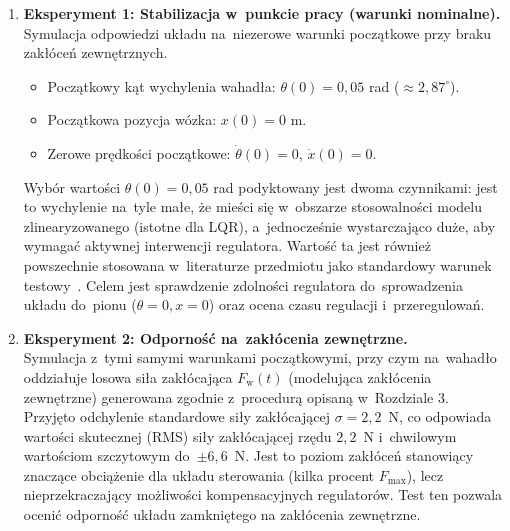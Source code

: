\begin{enumerate}
    \item \textbf{Eksperyment 1: Stabilizacja w~punkcie pracy (warunki nominalne).} \\
    Symulacja odpowiedzi układu na~niezerowe warunki początkowe przy braku
    zakłóceń zewnętrznych.
    \begin{itemize}
        \item Początkowy kąt wychylenia wahadła: $\theta(0) = 0{,}05$ rad ($\approx 2{,}87^\circ$).
        \item Początkowa pozycja wózka: $x(0) = 0$ m.
        \item Zerowe prędkości początkowe: $\dot{\theta}(0) = 0$, $\dot{x}(0) = 0$.
    \end{itemize}
    Wybór wartości $\theta(0) = 0{,}05$ rad podyktowany jest dwoma czynnikami:
    jest to wychylenie na~tyle małe, że mieści się w~obszarze stosowalności 
    modelu zlinearyzowanego (istotne dla LQR), a~jednocześnie wystarczająco duże,
    aby wymagać aktywnej interwencji regulatora. Wartość ta jest również powszechnie
    stosowana w~literaturze przedmiotu jako standardowy warunek testowy~\cite{Prasad2014}.
    Celem jest sprawdzenie zdolności regulatora do~sprowadzenia układu do~pionu
    ($\theta=0, x=0$) oraz ocena czasu regulacji i~przeregulowań.

    \item \textbf{Eksperyment 2: Odporność na~zakłócenia zewnętrzne.} \\
    Symulacja z~tymi samymi warunkami początkowymi, przy czym na~wahadło
    oddziałuje losowa siła zakłócająca $F_{\mathrm{w}}(t)$ (modelująca
    zakłócenia zewnętrzne) generowana zgodnie z~procedurą opisaną w~Rozdziale 3. 
    Przyjęto odchylenie standardowe siły zakłócającej $\sigma = 2{,}2$~N,
    co odpowiada wartości skutecznej (RMS) siły zakłócającej rzędu $2{,}2$~N
    i~chwilowym wartościom szczytowym do~$\pm 6{,}6$~N. Jest to poziom 
    zakłóceń stanowiący znaczące obciążenie dla układu sterowania 
    (kilka procent $F_{\max}$), lecz nieprzekraczający możliwości
    kompensacyjnych regulatorów. Test ten pozwala ocenić odporność 
    układu zamkniętego na zakłócenia zewnętrzne.


\end{enumerate}
